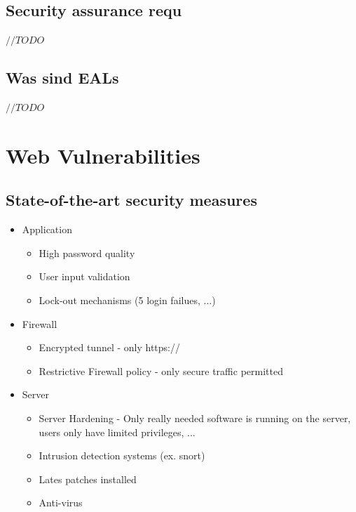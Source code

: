 \documentclass[a4paper, 12pt]{article}
\begin{document}
\subsection{Security assurance requ}
$ //TODO $
\subsection{Was sind EALs}
$ //TODO $

\section{Web Vulnerabilities}
\subsection{State-of-the-art security measures}
\begin{itemize}
	\item Application	
	\begin{itemize}
		\item High password quality
		\item User input validation
		\item Lock-out mechanisms (5 login failues, ...)
	\end{itemize}
	\item Firewall
	\begin{itemize}
		\item Encrypted tunnel - only https://
		\item Restrictive Firewall policy - only secure traffic permitted
	\end{itemize}
	\item Server
	\begin{itemize}
		\item Server Hardening - Only really needed software is running on the server, users only have limited privileges, ...
		\item Intrusion detection systems (ex. snort)
		\item Lates patches installed
		\item Anti-virus
	\end{itemize}
\end{itemize}
\end{document}
